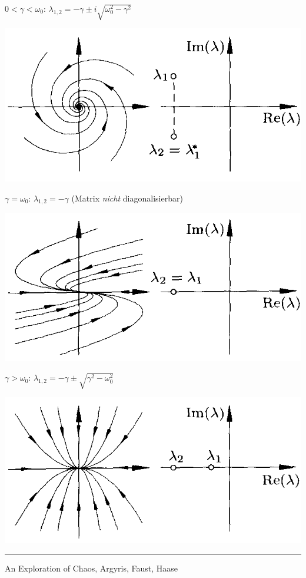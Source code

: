 \documentclass[12pt,compress]{beamer}
\begin{document}
{    
    {
    $0 < \gamma < \omega_0$: $\lambda_{1,2} = -\gamma \pm i \sqrt{\omega_0^2-\gamma^2}$

    \begin{center}
    \includegraphics[scale=0.5]{03_stable_focus.png}
    \end{center}
    }

    {
    $\gamma = \omega_0$: $\lambda_{1,2} = -\gamma$ (Matrix {\it nicht} diagonalisierbar)

    \begin{center}
    \includegraphics[scale=0.5]{08_stable_node.png}
    \end{center}
    }

    {
    $\gamma > \omega_0$: $\lambda_{1,2} = -\gamma \pm \sqrt{\gamma^2-\omega_0^2}$

    \begin{center}
    \includegraphics[scale=0.5]{01_stable_node.png}
    \end{center}
    }

    {
    \vfill
    \noindent\rule{8cm}{0.4pt}

    An Exploration of Chaos, Argyris, Faust, Haase
    }
}
\end{document}
